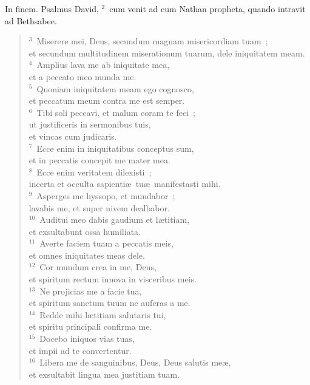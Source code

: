 \bchapter
\lettrine[lines=3,image=true,loversize=0.05,lraise=-0.03]{I}{}n finem. Psalmus David,
${}^{2}$~cum venit ad eum Nathan propheta, quando intravit ad Bethsabee.
\begin{flushleft}\begin{verse}${}^{3}$~Miserere mei, Deus, secundum magnam misericordiam tuam~;\\ et secundum multitudinem miserationum tuarum, dele iniquitatem meam.\\
${}^{4}$~Amplius lava me ab iniquitate mea,\\ et a peccato meo munda me.\\
${}^{5}$~Quoniam iniquitatem meam ego cognosco,\\ et peccatum meum contra me est semper.\\
${}^{6}$~Tibi soli peccavi, et malum coram te feci~;\\ ut justificeris in sermonibus tuis,\\ et vincas cum judicaris.\\
${}^{7}$~Ecce enim in iniquitatibus conceptus sum,\\ et in peccatis concepit me mater mea.\\
${}^{8}$~Ecce enim veritatem dilexisti~;\\ incerta et occulta sapienti\ae\ tu\ae\ manifestasti mihi.\\
${}^{9}$~Asperges me hyssopo, et mundabor~;\\ lavabis me, et super nivem dealbabor.\\
${}^{10}$~Auditui meo dabis gaudium et l\ae titiam,\\ et exsultabunt ossa humiliata.\\
${}^{11}$~Averte faciem tuam a peccatis meis,\\ et omnes iniquitates meas dele.\\
${}^{12}$~Cor mundum crea in me, Deus,\\ et spiritum rectum innova in visceribus meis.\\
${}^{13}$~Ne projicias me a facie tua,\\ et spiritum sanctum tuum ne auferas a me.\\
${}^{14}$~Redde mihi l\ae titiam salutaris tui,\\ et spiritu principali confirma me.\\
${}^{15}$~Docebo iniquos vias tuas,\\ et impii ad te convertentur.\\
${}^{16}$~Libera me de sanguinibus, Deus, Deus salutis me\ae ,\\ et exsultabit lingua mea justitiam tuam.\\

\end{verse}
\end{flushleft}
